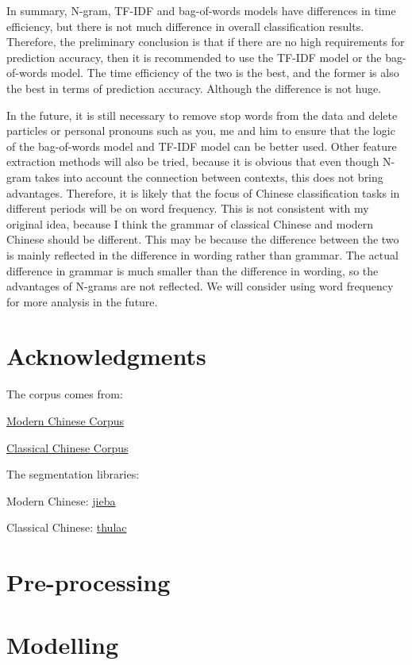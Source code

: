 \documentclass[11pt]{article}
\begin{document}
In summary, N-gram, TF-IDF and bag-of-words models have differences in time efficiency, but there is not much difference in overall classification results. Therefore, the preliminary conclusion is that if there are no high requirements for prediction accuracy, then it is recommended to use the TF-IDF model or the bag-of-words model. The time efficiency of the two is the best, and the former is also the best in terms of prediction accuracy. Although the difference is not huge.

In the future, it is still necessary to remove stop words from the data and delete particles or personal pronouns such as you, me and him to ensure that the logic of the bag-of-words model and TF-IDF model can be better used. Other feature extraction methods will also be tried, because it is obvious that even though N-gram takes into account the connection between contexts, this does not bring advantages. Therefore, it is likely that the focus of Chinese classification tasks in different periods will be on word frequency. This is not consistent with my original idea, because I think the grammar of classical Chinese and modern Chinese should be different. This may be because the difference between the two is mainly reflected in the difference in wording rather than grammar. The actual difference in grammar is much smaller than the difference in wording, so the advantages of N-grams are not reflected. We will consider using word frequency for more analysis in the future.

\section*{Acknowledgments}

The corpus comes from:

\href{https://github.com/codemayq/chinese-chatbot-corpus}{Modern Chinese Corpus}

\href{https://github.com/NiuTrans/Classical-Modern}{Classical Chinese Corpus}

The segmentation libraries:

Modern Chinese: \href{https://github.com/fxsjy/jieba}{jieba}

Classical Chinese: \href{http://thulac.thunlp.org/}{thulac}



\onecolumn
\appendix

\section{Pre-processing}
\label{sec:appendix}


\clearpage

\section{Modelling}
\label{sec:appendix}

\end{document}

